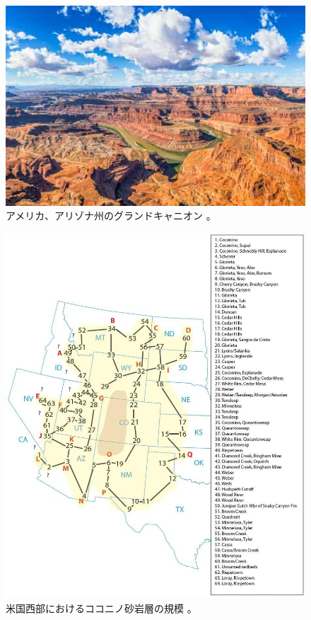\documentclass[10pt,twocolumn,letterpaper]{article}
\begin{document}
\begin{figure}[b]
\begin{center}
   \includegraphics[width=1\linewidth]{grand-canyon.jpg}
\end{center}
   \caption{アメリカ、アリゾナ州のグランドキャニオン \cite{49}。}
\label{fig:2}
\label{fig:onecol}
\end{figure}

\begin{figure}[t]
\begin{center}
   \includegraphics[width=1\linewidth]{coconino.jpg}
\end{center}
   \caption{米国西部におけるココニノ砂岩層の規模 \cite{21}。}
\label{fig:3}
\label{fig:onecol}
\end{figure}
\end{document}
